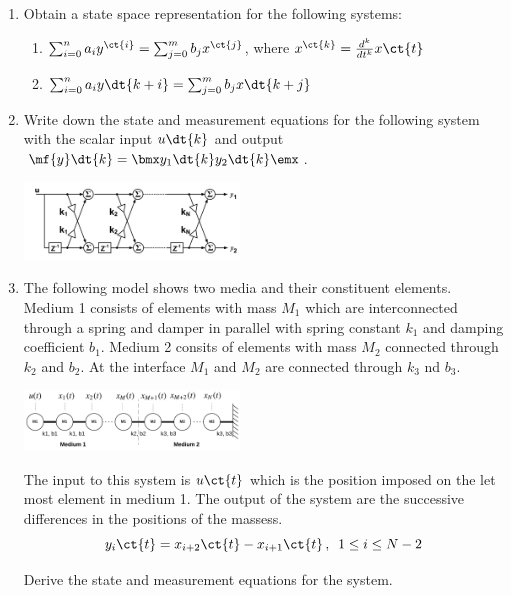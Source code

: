 \begin{enumerate}[resume]
    \item Obtain a state space representation for the following systems:
    \begin{enumerate}
        \item $\sum_{i=0}^n a_iy^{\ct{i}} = \sum_{j=0}^m b_jx^{\ct{j}}$, where $x^{\ct{k}} = \frac{d^k}{dt^k}x\ct{t}$
        \item $\sum_{i=0}^n a_iy\dt{k+i} = \sum_{j=0}^m b_jx\dt{k+j}$
    \end{enumerate}

    \item Write down the state and measurement equations for the following system with the scalar input $u\dt{k}$ and output $\mf{y}\dt{k} = \bmx y_1\dt{k}\\ y_2\dt{k}\emx$. 

    \includegraphics[width=0.45\textwidth]{sections/figs/latticefilt.png}

    \item The following model shows two media and their constituent elements. Medium 1 consists of elements with mass $M_1$ which are interconnected through a spring and damper in parallel with spring constant $k_1$ and damping coefficient $b_1$. Medium 2 consits of elements with mass $M_2$ connected through $k_2$ and $b_2$. At the interface $M_1$ and $M_2$ are connected through $k_3$ nd $b_3$.

    \includegraphics[width=0.45\textwidth]{sections/figs/wavetx.png}    

    The input to this system is $u\ct{t}$ which is the position imposed on the let most element in medium 1. The output of the system are the successive differences in the positions of the massess.
    \[ y_i\ct{t} = x_{i+2}\ct{t} - x_{i+1}\ct{t} \, ,\,\,\, 1 \leq i \leq N-2 \]

    Derive the state and measurement equations for the system.


\end{enumerate}
